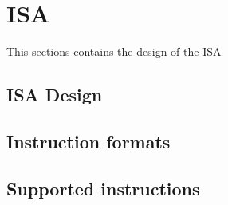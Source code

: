 \section{ISA} \label{fpga:isa:s:isa}



This sections contains the design of the ISA

\subsection{ISA Design}


\subsection{Instruction formats}\label{fpga:isa:ss:instruction_formats}

\subsection{Supported instructions} \label{fpga:isa:ss:supported_instructions}